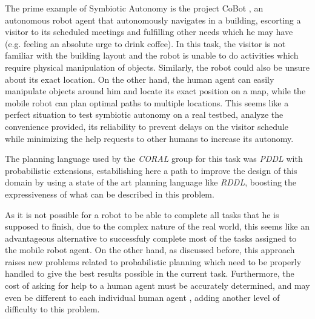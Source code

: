 The prime example of Symbiotic Autonomy is the project CoBot \cite{Rosenthal2010},
an autonomous robot agent that autonomously navigates in a building,
escorting a visitor to its scheduled meetings and fulfilling other needs which
he may have (e.g. feeling an absolute urge to drink coffee). In this task, the
visitor is not familiar with the building layout and the robot is unable to do
activities which require physical manipulation of objects. Similarly, the
robot could also be unsure about its exact location. On the other hand, the
human agent can easily manipulate objects around him and locate its exact
position on a map, while the mobile robot can plan optimal paths to multiple
locations. This seems like a perfect situation to test symbiotic autonomy on
a real testbed, analyze the convenience provided, its reliability to prevent
delays on the visitor schedule while minimizing the help requests to other
humans to increase its autonomy.

The planning language used by the \textit{CORAL} group for this task was
\textit{PDDL} with probabilistic extensions, estabilishing here a path to
improve the design of this domain by using a state of the art planning language
like \textit{RDDL}, boosting the expressiveness of what can be described in this
problem.

As it is not possible for a robot to be able to complete all tasks that he is
supposed to finish, due to the complex nature of the real world, this seems like
an advantageous alternative to successfuly complete most of the tasks assigned
to the mobile robot agent. On the other hand, as discussed before, this approach
raises new problems related to probabilistic planning which need to be properly
handled to give the best results possible in the current task. Furthermore, the
cost of asking for help to a human agent must be accurately determined, and may
even be different to each individual human agent \cite{Rosenthal2011}, adding
another level of difficulty to this problem.
